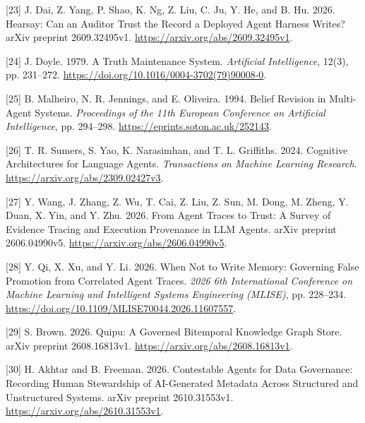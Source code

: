 \documentclass[acmlarge,nonacm]{acmart}
\newlength{\cslhangindent}
\newlength{\cslentryspacingunit} %
\newenvironment{CSLReferences}[2] %
 {\bibliofont %
  \setlength{\parindent}{0pt}
  \ifodd #1
  \let\oldpar\par
  \def\par{\hangindent=\cslhangindent\oldpar}
  \fi
  \setlength{\parskip}{#2\cslentryspacingunit}
 }%
 {}
\begin{document}
\begin{CSLReferences}{1}{1}
\leavevmode{}%
{[}23{]} J. Dai, Z. Yang, P. Shao, K. Ng, Z. Liu, C. Ju, Y. He, and B.
Hu. 2026. Hearsay: Can an Auditor Trust the Record a Deployed Agent
Harness Writes? arXiv preprint 2609.32495v1.
\url{https://arxiv.org/abs/2609.32495v1}.

\leavevmode{}%
{[}24{]} J. Doyle. 1979. A Truth Maintenance System. \emph{Artificial
Intelligence}, 12(3), pp. 231--272.
\url{https://doi.org/10.1016/0004-3702(79)90008-0}.

\leavevmode{}%
{[}25{]} B. Malheiro, N. R. Jennings, and E. Oliveira. 1994. Belief
Revision in Multi-Agent Systems. \emph{Proceedings of the 11th European
Conference on Artificial Intelligence}, pp. 294--298.
\url{https://eprints.soton.ac.uk/252143}.

\leavevmode{}%
{[}26{]} T. R. Sumers, S. Yao, K. Narasimhan, and T. L. Griffiths. 2024.
Cognitive Architectures for Language Agents. \emph{Transactions on
Machine Learning Research}. \url{https://arxiv.org/abs/2309.02427v3}.

\leavevmode{}%
{[}27{]} Y. Wang, J. Zhang, Z. Wu, T. Cai, Z. Liu, Z. Sun, M. Dong, M.
Zheng, Y. Duan, X. Yin, and Y. Zhu. 2026. From Agent Traces to Trust: A
Survey of Evidence Tracing and Execution Provenance in LLM Agents. arXiv
preprint 2606.04990v5. \url{https://arxiv.org/abs/2606.04990v5}.

\leavevmode{}%
{[}28{]} Y. Qi, X. Xu, and Y. Li. 2026. When Not to Write Memory:
Governing False Promotion from Correlated Agent Traces. \emph{2026 6th
International Conference on Machine Learning and Intelligent Systems
Engineering (MLISE)}, pp. 228--234.
\url{https://doi.org/10.1109/MLISE70044.2026.11607557}.

\leavevmode{}%
{[}29{]} S. Brown. 2026. Quipu: A Governed Bitemporal Knowledge Graph
Store. arXiv preprint 2608.16813v1.
\url{https://arxiv.org/abs/2608.16813v1}.

\leavevmode{}%
{[}30{]} H. Akhtar and B. Freeman. 2026. Contestable Agents for Data
Governance: Recording Human Stewardship of AI-Generated Metadata Across
Structured and Unstructured Systems. arXiv preprint 2610.31553v1.
\url{https://arxiv.org/abs/2610.31553v1}.


\end{CSLReferences}
\end{document}
